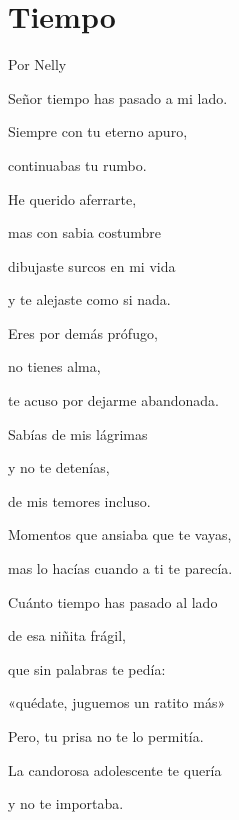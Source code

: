 \documentclass[11pt,twoside,openright,a5paper]{book}
\begin{document}
\section*{Tiempo}
                                                                                                            \begin{flushright}Por Nelly\end{flushright}
\begin{center}
Señor tiempo has pasado a mi lado.

Siempre con tu eterno apuro,

continuabas tu rumbo.

\vspace{0.5cm} 

He querido aferrarte,

mas con sabia costumbre

dibujaste surcos en mi vida

y te alejaste como si nada.

\vspace{0.5cm}

Eres por demás prófugo, 

no tienes alma,

te acuso por dejarme abandonada.

\vspace{0.5cm}

Sabías de mis lágrimas

y no te detenías,

de  mis temores incluso.

\vspace{0.5cm}

Momentos que ansiaba que te vayas,

mas lo hacías cuando a ti te parecía.
 
Cuánto tiempo has pasado al lado

de esa niñita frágil,

que sin palabras te pedía:

«quédate, juguemos un ratito más»

\vspace{0.5cm}

Pero, tu prisa no te lo permitía.
 
La candorosa adolescente te quería

y no te importaba.

\vspace{0.5cm}


\end{center}
\end{document}
